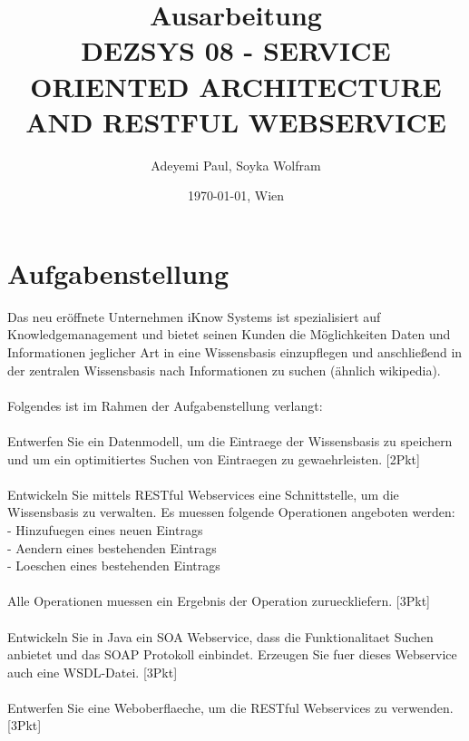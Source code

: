 \documentclass[11pt]{article}
\title{Ausarbeitung\\DEZSYS 08 -
SERVICE ORIENTED ARCHITECTURE AND RESTFUL WEBSERVICE}
\author{Adeyemi Paul, Soyka Wolfram}
\date{\today{}, Wien}
\begin{document}
\maketitle
\newpage
\tableofcontents
\newpage

        
\section{Aufgabenstellung}
Das neu eröffnete Unternehmen iKnow Systems ist spezialisiert auf Knowledgemanagement und bietet seinen Kunden die Möglichkeiten Daten und Informationen jeglicher Art in eine Wissensbasis einzupflegen und anschließend in der zentralen Wissensbasis nach Informationen zu suchen (ähnlich wikipedia).\\
\\
Folgendes ist im Rahmen der Aufgabenstellung verlangt:\\
\\
Entwerfen Sie ein Datenmodell, um die Eintraege der Wissensbasis zu speichern und um ein optimitiertes Suchen von Eintraegen zu gewaehrleisten. [2Pkt]\\
\\
Entwickeln Sie mittels RESTful Webservices eine Schnittstelle, um die Wissensbasis zu verwalten. Es muessen folgende Operationen angeboten werden:\\
- Hinzufuegen eines neuen Eintrags\\
- Aendern eines bestehenden Eintrags\\
- Loeschen eines bestehenden Eintrags\\
\\
Alle Operationen muessen ein Ergebnis der Operation zurueckliefern. [3Pkt]\\
\\
Entwickeln Sie in Java ein SOA Webservice, dass die Funktionalitaet Suchen anbietet und das SOAP Protokoll einbindet. Erzeugen Sie fuer dieses Webservice auch eine WSDL-Datei. [3Pkt]\\
\\
Entwerfen Sie eine Weboberflaeche, um die RESTful Webservices zu verwenden. [3Pkt]\\
\end{document}
